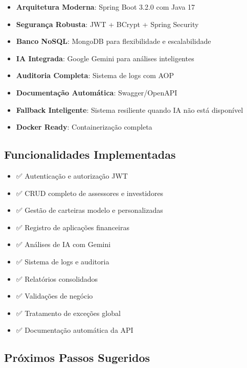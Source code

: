 \documentclass[12pt,a4paper]{article}
\begin{document}
\begin{successbox}
\begin{itemize}
    \item \textbf{Arquitetura Moderna}: Spring Boot 3.2.0 com Java 17
    \item \textbf{Segurança Robusta}: JWT + BCrypt + Spring Security
    \item \textbf{Banco NoSQL}: MongoDB para flexibilidade e escalabilidade
    \item \textbf{IA Integrada}: Google Gemini para análises inteligentes
    \item \textbf{Auditoria Completa}: Sistema de logs com AOP
    \item \textbf{Documentação Automática}: Swagger/OpenAPI
    \item \textbf{Fallback Inteligente}: Sistema resiliente quando IA não está disponível
    \item \textbf{Docker Ready}: Containerização completa
\end{itemize}
\end{successbox}

\subsection{Funcionalidades Implementadas}

\begin{itemize}
    \item ✅ Autenticação e autorização JWT
    \item ✅ CRUD completo de assessores e investidores
    \item ✅ Gestão de carteiras modelo e personalizadas
    \item ✅ Registro de aplicações financeiras
    \item ✅ Análises de IA com Gemini
    \item ✅ Sistema de logs e auditoria
    \item ✅ Relatórios consolidados
    \item ✅ Validações de negócio
    \item ✅ Tratamento de exceções global
    \item ✅ Documentação automática da API
\end{itemize}

\subsection{Próximos Passos Sugeridos}
\end{document}
